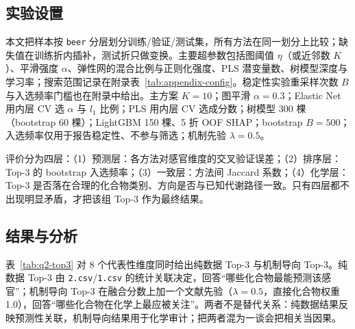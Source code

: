 \subsection{实验设置}

本文把样本按 \texttt{beer} 分层划分训练/验证/测试集，所有方法在同一划分上比较；缺失值在训练折内插补，测试折只做变换。主要超参数包括图阈值 $\eta$（或近邻数 $K$）、平滑强度 $\alpha$、弹性网的混合比例与正则化强度、PLS 潜变量数、树模型深度与学习率；搜索范围记录在附录表~\ref{tab:appendix-config}。稳定性实验重采样次数 $B$ 与入选频率门槛也在附录中给出。主方案 $K=10$；图平滑 $\alpha=0.3$；Elastic Net 用内层 CV 选 $\alpha$ 与 $l_1$ 比例；PLS 用内层 CV 选成分数；树模型 300 棵（bootstrap 60 棵）；LightGBM 150 棵、5 折 OOF SHAP；bootstrap $B=500$；入选频率仅用于报告稳定性、不参与筛选；机制先验 $\lambda=0.5$。

评价分为四层：（1）预测层：各方法对感官维度的交叉验证误差；（2）排序层：Top-3 的 bootstrap 入选频率；（3）一致层：方法间 Jaccard 系数；（4）化学层：Top-3 是否落在合理的化合物类别、方向是否与已知代谢路径一致。只有四层都不出现明显矛盾，才把该组 Top-3 作为最终结果。

\subsection{结果与分析}

表~\ref{tab:q2-top3} 对 8 个代表性维度同时给出纯数据 Top-3 与机制导向 Top-3。纯数据 Top-3 由 \texttt{2.csv}/\texttt{1.csv} 的统计关联决定，回答“哪些化合物最能预测该感官”；机制导向 Top-3 在融合分数上加一个文献先验（$\lambda=0.5$，直接化合物权重 1.0），回答“哪些化合物在化学上最应被关注”。两者不是替代关系：纯数据结果反映预测性关联，机制导向结果用于化学审计；把两者混为一谈会把相关当因果。

